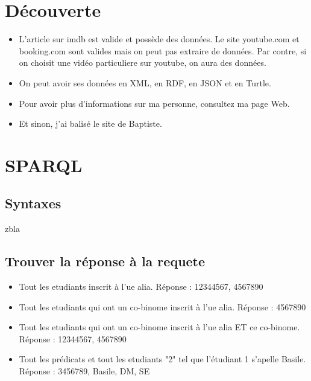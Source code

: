 \documentclass[12pt]{article}
\begin{document}
\section{Découverte}

\begin{itemize}

\item L'article sur imdb est valide et possède des données. Le site youtube.com et booking.com sont valides mais on peut pas extraire de données. Par contre, si on choisit une vidéo particuliere sur youtube, on aura des données.

\item On peut avoir ses données en XML, en RDF, en JSON et en Turtle.

\item Pour avoir plus d'informations sur ma personne, consultez ma page Web.

\item Et sinon, j'ai balisé le site de Baptiste.

\end{itemize}

\section{SPARQL}

\subsection{Syntaxes}
zbla

\subsection{Trouver la réponse à la requete}
\begin{itemize}
\item Tout les etudiants inscrit à l'ue alia. Réponse : 12344567, 4567890
\item Tout les etudiants qui ont un co-binome inscrit à l'ue alia. Réponse : 4567890
\item Tout les etudiants qui ont un co-binome inscrit à l'ue alia ET ce co-binome. Réponse : 12344567, 4567890 
\item Tout les prédicats et tout les etudiants "2" tel que l'étudiant 1 s'apelle Basile. Réponse : 3456789, Basile, DM, SE
\end{itemize}
\end{document}
